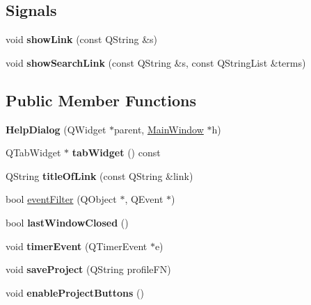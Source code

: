 \subsection*{Signals}
\begin{DoxyCompactItemize}
\item 
\hypertarget{classHelpDialog_abffd1a837823a484a58c4e56a3a97604}{
void {\bfseries showLink} (const QString \&s)}
\label{classHelpDialog_abffd1a837823a484a58c4e56a3a97604}

\item 
\hypertarget{classHelpDialog_a434e00e2ff4488dd6d24178f78a64909}{
void {\bfseries showSearchLink} (const QString \&s, const QStringList \&terms)}
\label{classHelpDialog_a434e00e2ff4488dd6d24178f78a64909}

\end{DoxyCompactItemize}
\subsection*{Public Member Functions}
\begin{DoxyCompactItemize}
\item 
\hypertarget{classHelpDialog_a106ebabc9f90e9031c61021b58759b19}{
{\bfseries HelpDialog} (QWidget $\ast$parent, \hyperlink{classMainWindow}{MainWindow} $\ast$h)}
\label{classHelpDialog_a106ebabc9f90e9031c61021b58759b19}

\item 
\hypertarget{classHelpDialog_a475f3b30f05c7be1edc58ed03d86d8cd}{
QTabWidget $\ast$ {\bfseries tabWidget} () const }
\label{classHelpDialog_a475f3b30f05c7be1edc58ed03d86d8cd}

\item 
\hypertarget{classHelpDialog_a952701f2692f9f29ee34d7b6c256c95a}{
QString {\bfseries titleOfLink} (const QString \&link)}
\label{classHelpDialog_a952701f2692f9f29ee34d7b6c256c95a}

\item 
bool \hyperlink{classHelpDialog_ad5458da0f9f360dec6a02ed803af7654}{eventFilter} (QObject $\ast$, QEvent $\ast$)
\item 
\hypertarget{classHelpDialog_aebf5379bde63e652ac680d1109a03264}{
bool {\bfseries lastWindowClosed} ()}
\label{classHelpDialog_aebf5379bde63e652ac680d1109a03264}

\item 
\hypertarget{classHelpDialog_a4faff409b9672538b3aeff7b6f685452}{
void {\bfseries timerEvent} (QTimerEvent $\ast$e)}
\label{classHelpDialog_a4faff409b9672538b3aeff7b6f685452}

\item 
\hypertarget{classHelpDialog_a9b1ffda61e9b36b6bd58d668ea4bee9c}{
void {\bfseries saveProject} (QString profileFN)}
\label{classHelpDialog_a9b1ffda61e9b36b6bd58d668ea4bee9c}

\item 
\hypertarget{classHelpDialog_a045569592aee2c23716f7f0ff69fe74d}{
void {\bfseries enableProjectButtons} ()}
\label{classHelpDialog_a045569592aee2c23716f7f0ff69fe74d}

\end{DoxyCompactItemize}
